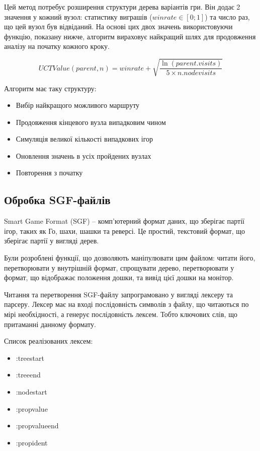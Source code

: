 Цей метод потребує розширення структури дерева варіантів гри. Він додає 2 значення у кожний вузол: статистику виграшів ($winrate \in [0; 1]$) та число раз, що цей вузол був відвіданий. На основі цих двох значень використовуючи функцію, показану нижче, алгоритм вираховує найкращий шлях для продовження аналізу на початку кожного кроку.

\begin{equation*}
    UCTValue(parent,n)=winrate+\sqrt{\frac{\ln(parent.visits)}{5\times n.nodevisits}}
\end{equation*}

Алгоритм має таку структуру:
\begin{itemize}
	\item Вибір найкращого можливого маршруту
	\item Продовження кінцевого вузла випадковим чином
	\item Симуляція великої кількості випадкових ігор
	\item Оновлення значень в усіх пройдених вузлах
	\item Повторення з початку
\end{itemize}

\subsection{Обробка SGF-файлів}
Smart Game Format (SGF) -- комп'ютерний формат даних, що зберігає партії ігор, таких як Го, шахи, шашки та реверсі. Це простий, текстовий формат, що зберігає партії у вигляді дерев.

Були розроблені функції, що дозволяють маніпулювати цим файлом: читати його, перетворювати у внутрішній формат, спрощувати дерево, перетворювати у формат, що відображає положення дошки, та вивід цієї дошки на монітор.

Читання та перетворення SGF-файлу запрограмовано у вигляді лексеру та парсеру. Лексер має на вході послідовність символів з файлу, що читаються по мірі необхідності, а генерує послідовність лексем. Тобто ключових слів, що притаманні данному формату.

Список реалізованих лексем:
\begin{itemize}
	\item :treestart
	\item :treeend
	\item :nodestart
	\item :propvalue
	\item :propvalueend
	\item :propident
\end{itemize}


